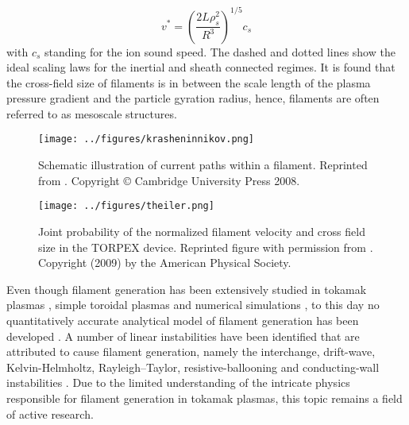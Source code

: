 \begin{equation}
  v^* = \left(\frac{2 L \rho_s^2}{R^3}\right)^{1/5} c_s
\end{equation}
with $c_s$ standing for the ion sound speed.
The dashed and dotted lines show the ideal scaling laws for the inertial and sheath connected regimes. It is found that the cross-field size of filaments is in between the scale length of the plasma pressure gradient and the particle gyration radius, hence, filaments are often referred to as mesoscale structures.
\begin{figure}
  \centering
  \begin{minipage}{.48\linewidth}
    \texttt{[image: ../figures/krasheninnikov.png]}
    \caption{Schematic illustration of current paths within a filament. Reprinted from \cite{krasheninnikov2008recent}. Copyright © Cambridge University Press 2008.}
    \label{Fig:krasheninnikov}
  \end{minipage}
  \hfill
  \begin{minipage}{.48\linewidth}
    \texttt{[image: ../figures/theiler.png]}
    \caption{Joint probability of the normalized filament velocity and cross field size in the TORPEX device. Reprinted figure with permission from \cite{theiler2009cross}. Copyright (2009) by the American Physical Society.}
    \label{Fig:theiler}
  \end{minipage}
\end{figure}

Even though filament generation has been extensively studied in tokamak plasmas
\cite{terry2005transport,agostini2007study}, simple toroidal plasmas
\cite{theiler2008role,muller2007plasma,furno2008experimental,furno2008mechanism} and
numerical simulations
\cite{garcia2004computations,bisai2005edge,russell2007collisionality,russell2009saturation},
to this day no quantitatively accurate analytical model of filament generation has been
developed \cite{d2011convective, krasheninnikov2007generation,
  krasheninnikov2008dynamics}. A number of linear instabilities have been identified that
are attributed to cause filament generation, namely the interchange, drift-wave,
Kelvin-Helmholtz, Rayleigh–Taylor, resistive-ballooning and conducting-wall
instabilities \cite{d2011convective,manz2015origin}. Due to the limited understanding of
the intricate physics responsible for filament generation in tokamak plasmas, this topic
remains a field of active research.

